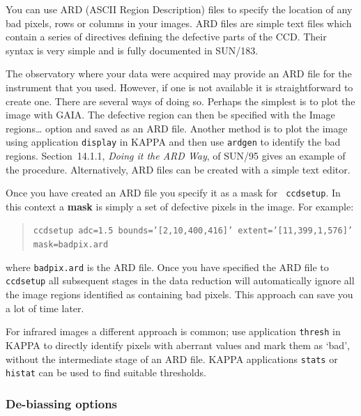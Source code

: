 \documentclass[twoside,11pt]{article}
\newcommand{\xref}[3]{#1}
\begin{document}
You can use ARD (ASCII Region Description) files to specify the location 
of any bad pixels, rows or columns in your images.  ARD files are simple
text files which contain a series of directives defining the defective
parts of the CCD.  Their syntax is very simple and is fully documented
in \xref{SUN/183}{sun183}{}\/\cite{SUN183}.

The observatory where your data were acquired may provide an ARD file for
the instrument that you used.  However, if one is not available it is
straightforward to create one.  There are several ways of doing so.
Perhaps the simplest is to plot the image with GAIA.  The defective region
can then be specified with the {\sf Image regions\ldots} option and saved
as an ARD file.  Another method is to plot the image using application
\xref{{\tt display}}{sun95}{DISPLAY} in KAPPA and then use
\xref{{\tt ardgen}}{sun95}{ARDGEN} to identify the bad regions.
\xref{Section~14.1.1, {\it Doing it the ARD Way}}{sun95}{se_ardwork}, of
\xref{SUN/95}{sun95}{} gives an example of the procedure.  Alternatively,
ARD files can be created with a simple text editor.

Once you have created an ARD file you specify it as a mask for {\tt
ccdsetup}.  In this context a {\bf mask} is simply a set of defective
pixels in the image.  For example:

\begin{quote}
{\tt ccdsetup~adc=1.5 bounds='[2,10,400,416]'~extent='[11,399,1,576]' \\
 \hspace*{3mm} mask=badpix.ard}
\end{quote}

where {\tt badpix.ard} is the ARD file.  Once you have specified the
ARD file to {\tt ccdsetup} all subsequent stages in the data reduction
will automatically ignore all the image regions identified as containing
bad pixels.  This approach can save you a lot of time later.

For infrared images a different approach is common; use application
\xref{{\tt thresh}}{sun95}{THRESH} in KAPPA to directly identify
pixels with aberrant values and mark them as `bad', without the
intermediate stage of an ARD file.  KAPPA applications
\xref{{\tt stats}}{sun95}{STATS} or \xref{{\tt histat}}{sun95}{HISTAT}
can be used to find suitable thresholds.

\subsubsection{De-biassing options}
\end{document}
